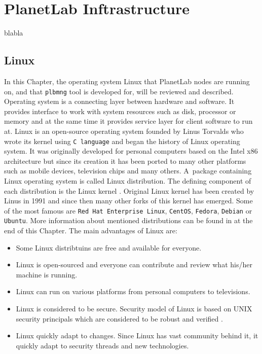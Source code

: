 \section{PlanetLab Inftrastructure}
\label{section:plinfra}

blabla

\subsection{Linux}
\label{subsection:Linux}
In this Chapter, the operating system Linux that PlanetLab nodes are running on, and that \texttt{plbmng} tool is developed for, will be reviewed and described. Operating system is a connecting layer between hardware and software. It provides interface to work with system resources such as disk, processor or memory and at the same time it provides service layer for client software to run at. Linux is an open-source operating system founded by Linus Torvalds who wrote its kernel using \texttt{C language} and began the history of Linux operating system. It was originally developed for personal computers based on the Intel x86 architecture but since its creation it has been ported to many other platforms such as mobile devices, television chips and many others. A~package containing Linux operating system is called Linux distribution. The defining component of each distribution is the Linux kernel \cite{eckert2012linux+}. Original Linux kernel has been created by Linus in 1991 \cite{linuxintro} and since then many other forks of this kernel has emerged. Some of the most famous are \texttt{Red Hat Enterprise Linux},  \texttt{CentOS}, \texttt{Fedora}, \texttt{Debian} or \texttt{Ubuntu}. More information about mentioned distributions can be found in at the end of this Chapter. The main advantages of Linux are:
\begin{itemize}
	\item Some Linux distribtuins are free and available for everyone.
	\item Linux is open-sourced and everyone can contribute and review what his/her machine is running.
	\item Linux can run on various platforms from personal computers to televisions.
	\item Linux is considered to be secure. Security model of Linux is based on UNIX security principals which are considered to be robust and verified \cite{BILHEQP2xqVnjbQi}. 
	\item Linux quickly adapt to changes. Since Linux has vast community behind it, it quickly adapt to security threads and new technologies.
\end{itemize}
